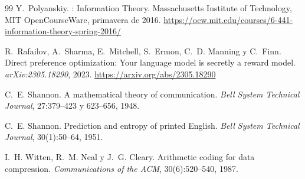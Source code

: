\begin{thebibliography}{99}
Y.~Polyanskiy.
: Information Theory.
\newblock Massachusetts Institute of Technology, MIT OpenCourseWare, primavera de 2016.
\newblock \url{https://ocw.mit.edu/courses/6-441-information-theory-spring-2016/}

R.~Rafailov, A.~Sharma, E.~Mitchell, S.~Ermon, C.~D. Manning y C.~Finn.
\newblock Direct preference optimization: Your language model is secretly a reward model.
\newblock \emph{arXiv:2305.18290}, 2023.
\newblock \url{https://arxiv.org/abs/2305.18290}

C.~E. Shannon.
\newblock A mathematical theory of communication.
\newblock \emph{Bell System Technical Journal}, 27:379--423 y 623--656, 1948.

C.~E. Shannon.
\newblock Prediction and entropy of printed English.
\newblock \emph{Bell System Technical Journal}, 30(1):50--64, 1951.

I.~H. Witten, R.~M. Neal y J.~G. Cleary.
\newblock Arithmetic coding for data compression.
\newblock \emph{Communications of the ACM}, 30(6):520--540, 1987.

\end{thebibliography}
